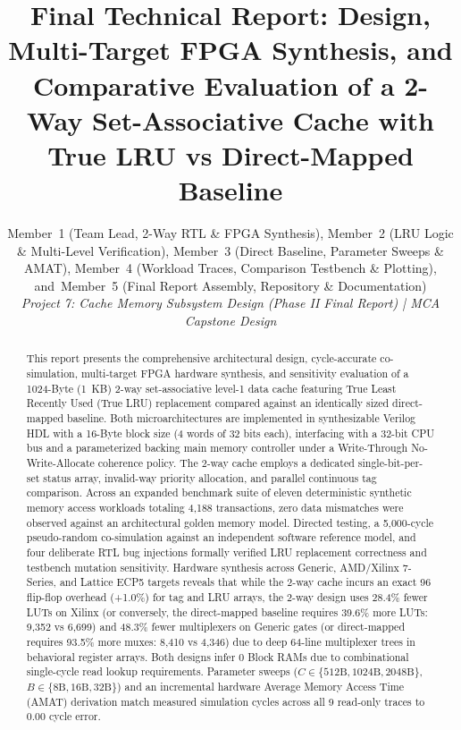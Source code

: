 \documentclass[journal,10pt,twocolumn]{IEEEtran}
\begin{document}
\title{Final Technical Report: Design, Multi-Target FPGA Synthesis, and Comparative Evaluation of a 2-Way Set-Associative Cache with True LRU vs Direct-Mapped Baseline}

\author{
    Member~1 (Team Lead, 2-Way RTL \& FPGA Synthesis),
    Member~2 (LRU Logic \& Multi-Level Verification),
    Member~3 (Direct Baseline, Parameter Sweeps \& AMAT),
    Member~4 (Workload Traces, Comparison Testbench \& Plotting),
    and~Member~5 (Final Report Assembly, Repository \& Documentation)\\
    \textit{Project 7: Cache Memory Subsystem Design (Phase II Final Report) | MCA Capstone Design}
}

\maketitle

\begin{abstract}
This report presents the comprehensive architectural design, cycle-accurate co-simulation, multi-target FPGA hardware synthesis, and sensitivity evaluation of a 1024-Byte (1~KB) 2-way set-associative level-1 data cache featuring True Least Recently Used (True LRU) replacement compared against an identically sized direct-mapped baseline. Both microarchitectures are implemented in synthesizable Verilog HDL with a 16-Byte block size (4 words of 32 bits each), interfacing with a 32-bit CPU bus and a parameterized backing main memory controller under a Write-Through No-Write-Allocate coherence policy. The 2-way cache employs a dedicated single-bit-per-set status array, invalid-way priority allocation, and parallel continuous tag comparison. Across an expanded benchmark suite of eleven deterministic synthetic memory access workloads totaling 4,188 transactions, zero data mismatches were observed against an architectural golden memory model. Directed testing, a 5,000-cycle pseudo-random co-simulation against an independent software reference model, and four deliberate RTL bug injections formally verified LRU replacement correctness and testbench mutation sensitivity. Hardware synthesis across Generic, AMD/Xilinx 7-Series, and Lattice ECP5 targets reveals that while the 2-way cache incurs an exact 96 flip-flop overhead (+1.0\%) for tag and LRU arrays, the 2-way design uses 28.4\% fewer LUTs on Xilinx (or conversely, the direct-mapped baseline requires 39.6\% more LUTs: 9,352 vs 6,699) and 48.3\% fewer multiplexers on Generic gates (or direct-mapped requires 93.5\% more muxes: 8,410 vs 4,346) due to deep 64-line multiplexer trees in behavioral register arrays. Both designs infer 0 Block RAMs due to combinational single-cycle read lookup requirements. Parameter sweeps ($C \in \{512\text{B}, 1024\text{B}, 2048\text{B}\}$, $B \in \{8\text{B}, 16\text{B}, 32\text{B}\}$) and an incremental hardware Average Memory Access Time (AMAT) derivation match measured simulation cycles across all 9 read-only traces to 0.00 cycle error.
\end{abstract}
\end{document}
